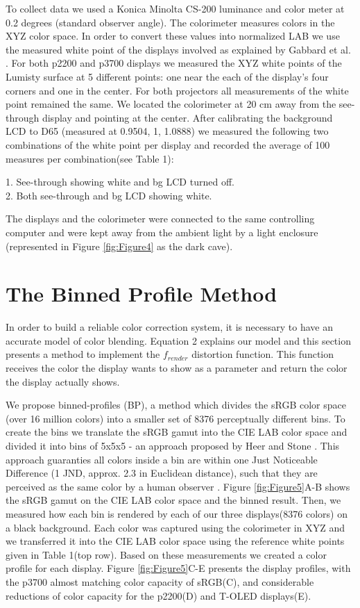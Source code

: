 \documentclass[annual]{acmsiggraph}
\begin{document}
To collect data we used a Konica Minolta CS-200 luminance and color meter at 0.2 degrees (standard observer angle). The colorimeter measures colors in the XYZ color space. In order to convert these values into normalized LAB we use the measured white point of the displays involved as explained by Gabbard et al. . For both p2200 and p3700 displays we measured the XYZ white points of the Lumisty surface at 5 different points: one near the each of the display's four corners and one in the center. For both projectors all measurements of the white point remained the same. We located the colorimeter at 20 cm away from the see-through display and pointing at the center. After calibrating the background LCD to D65 (measured at 0.9504, 1, 1.0888) we measured the following two combinations of the white point per display and recorded the average of 100 measures per combination(see Table 1):

1. See-through showing white and bg LCD turned off.\\
2. Both see-through and bg LCD showing white.

The displays and the colorimeter were connected to the same controlling computer and were kept away from the ambient light by a light enclosure (represented in Figure \ref{fig:Figure4} as the dark cave).

\section{The Binned Profile Method}

In order to build a reliable color correction system, it is necessary to have an accurate model of color blending. Equation 2 explains our model and this section presents a method to implement the $f_{render}$ distortion function. This function receives the color the display wants to show as a parameter and return the color the display actually shows.

We propose binned-profiles (BP), a method which divides the sRGB color space (over 16 million colors) into a smaller set of 8376 perceptually different bins. To create the bins we translate the sRGB gamut into the CIE LAB color space and divided it into bins of 5x5x5 - an approach proposed by Heer and Stone . This approach guaranties all colors inside a bin are within one Just Noticeable Difference (1 JND, approx. 2.3 in Euclidean distance), such that they are perceived as the same color by a human observer \cite{Mahy:1994}. Figure \ref{fig:Figure5}A-B shows the sRGB gamut on the CIE LAB color space and the binned result. Then, we measured how each bin is rendered by each of our three displays(8376 colors) on a black background. Each color was captured using the colorimeter in XYZ and we transferred it into the CIE LAB color space using the reference white points given in Table 1(top row). Based on these measurements we created a color profile for each display. Figure \ref{fig:Figure5}C-E presents the display profiles, with the p3700 almost matching color capacity of sRGB(C), and considerable reductions of color capacity for the p2200(D) and T-OLED displays(E).
\end{document}
